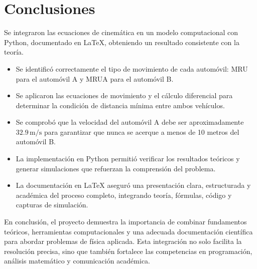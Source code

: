 \documentclass[12pt,a4paper]{article}
\begin{document}
\section{Conclusiones}
Se integraron las ecuaciones de cinemática en un modelo computacional con Python, 
documentado en LaTeX, obteniendo un resultado consistente con la teoría.


\begin{itemize}
    \item Se identificó correctamente el tipo de movimiento de cada automóvil: MRU para el automóvil A y MRUA para el automóvil B.
    \item Se aplicaron las ecuaciones de movimiento y el cálculo diferencial para determinar la condición de distancia mínima entre ambos vehículos.
    \item Se comprobó que la velocidad del automóvil A debe ser aproximadamente \(32.9 \,\text{m/s}\) para garantizar que nunca se acerque a menos de 10 metros del automóvil B.
    \item La implementación en Python permitió verificar los resultados teóricos y generar simulaciones que refuerzan la comprensión del problema.
    \item La documentación en LaTeX aseguró una presentación clara, estructurada y académica del proceso completo, integrando teoría, fórmulas, código y capturas de simulación.
\end{itemize}

En conclusión, el proyecto demuestra la importancia de combinar fundamentos teóricos, herramientas computacionales y una adecuada documentación científica para abordar problemas de física aplicada. Esta integración no solo facilita la resolución precisa, sino que también fortalece las competencias en programación, análisis matemático y comunicación académica.
\end{document}
